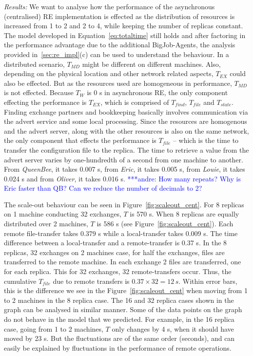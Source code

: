 \documentclass{rspublic}
\newcommand{\jhanote}[1]{ {\textcolor{red} { ***shantenu: #1 }}}
\newcommand{\alnote}[1]{ {\textcolor{blue} { ***andre: #1 }}}
\newcommand{\alnote}[1]{}
\newcommand{\jhanote}[1]{}
\begin{document}
{\it Results:} We want to analyse how
the performance of the asynchronous (centralised) RE implementation is
effected as the distribution of resources is increased from 1 to 2 and
2 to 4, while keeping the number of replicas constant. The model
developed in Equation~\ref{eq:totaltime} still holds and after factoring in the
performance advantage due to the additional BigJob-Agents, the
analysis provided
in~\ref{sec:re_impl}(c) %
can be used to understand the behaviour. In a distributed scenario,
$T_{MD}$ might be different on different machines. Also, depending on
the physical location and other network related aspects, $T_{EX}$
could also be effected.  But as the resources used are homogeneous in
performance, $T_{MD}$ is not effected. Because $T_W$ is 0 s in
asynchronous RE, the only component effecting the performance is
$T_{EX}$, which is comprised of $T_{find}$, $T_{file}$ and
$T_{state}$. Finding exchange partners and bookkeeping basically
involves communication via the advert service and some local
processing.  Since the resources are homogenous and the advert server,
along with the other resources is also on the same network, the only
component that effects the performance is $T_{file}$ -- which is
the time to transfer the configuration file to the replica. The time
to retrieve a value from the advert server varies by one-hundredth of
a second from one machine to another. From {\it QueenBee}, it takes
0.007 s, from {\it Eric}, it takes 0.005 s, from {\it Louie}, it takes
0.024 s and from {\it Oliver}, it takes 0.016 s. \alnote{How many repeats?
Why is Eric faster than QB? Can we reduce the number of decimals to 2?}

The scale-out behaviour can be seen in Figure~\ref{fig:scaleout_cent}. 
For 8 replicas on 1 machine conducting 32 exchanges, $T$ is 570
s. When 8 replicas are equally distributed over 2 machines, $T$ is 586
s (see Figure~\ref{fig:scaleout_cent}). Each remote file-transfer
takes 0.379 s while a local-transfer takes 0.009 s. The time
difference between a local-transfer and a remote-transfer is 0.37
s. In the 8 replicas, 32 exchanges on 2 machines case, for half the
exchanges, files are transferred to the remote machine. In each
exchange 2 files are transferred, one for each replica. This for 32
exchanges, 32 remote-transfers occur. Thus, the cumulative $T_{file}$
due to remote transfers is $0.37 \times 32=12\,s$. Within error bars,
this is the difference we see in the Figure~\ref{fig:scaleout_cent}
when moving from 1 to 2 machines in the 8 replica case. The 16 and 32
replica cases shown in the graph can be analysed in similar manner.
Some of the data points on the graph do not behave in the model that
we predicted. %
For example, in the 16 replica case, going from 1 to 2 machines, $T$
only changes by 4 s, when it should have moved by 23 s. But the
fluctuations are of the same order (seconds), and can easily be
explained by fluctuations in the performance of remote operations.
\end{document}
